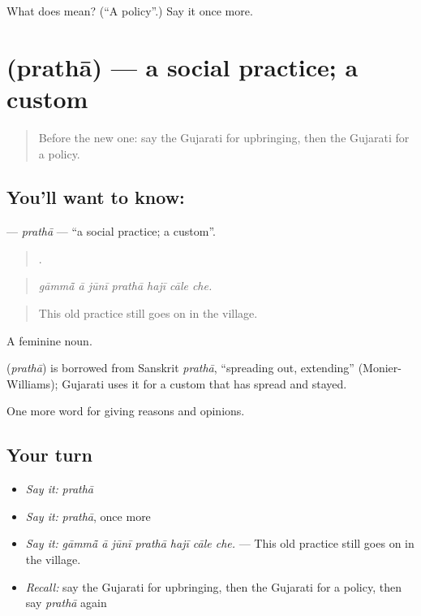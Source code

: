\begin{tcolorbox}[breakable,colback=teal!4,colframe=teal!35!black,title={Before you move on}]
What does  mean? (\textquotedblleft{}A policy\textquotedblright{}.) Say it once more.
\end{tcolorbox}
\section[\texorpdfstring{\gu{પ્રથા} (prathā)}{પ્રથા (prathā)}]{ (prathā) — a social practice; a custom}

\label{lesson:GU-C357-pratha}



\begin{quote}
Before the new one: say the Gujarati for upbringing, then the Gujarati for a policy.
\end{quote}

\subsection*{You'll want to know: }
\textbf{} — \emph{prathā} — \textquotedblleft{}a social practice; a custom\textquotedblright{}.

\begin{quote}
      .
\end{quote}

\begin{quote}
\emph{gāmmā̃ ā jūnī prathā hajī cāle che.}
\end{quote}

\begin{quote}
This old practice still goes on in the village.
\end{quote}

A feminine noun.

\begin{cousinweb}
\textbf{} (\emph{prathā}) is borrowed from Sanskrit \emph{prathā}, \textquotedblleft{}spreading out, extending\textquotedblright{} (Monier-Williams); Gujarati uses it for a custom that has spread and stayed.
\end{cousinweb}

\begin{grammarlens}[title={What you've built}]
One more word for giving reasons and opinions.
\end{grammarlens}

\subsection*{Your turn}
\begin{itemize}
\raggedright
  \item \emph{Say it:} \emph{prathā}
  \item \emph{Say it:} \emph{prathā}, once more
  \item \emph{Say it:} \emph{gāmmā̃ ā jūnī prathā hajī cāle che.} — This old practice still goes on in the village.
  \item \emph{Recall:} say the Gujarati for upbringing, then the Gujarati for a policy, then say \emph{prathā} again
\end{itemize}

